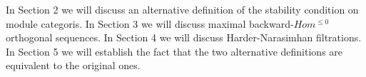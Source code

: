 \indent In Section 2 we will discuss an alternative definition of the stability condition on module categoris. In Section 3 we will discuss maximal backward-$Hom^{\leq 0}$ orthogonal sequences. In Section 4 we will discuss Harder-Narasimhan filtrations. In Section 5 we will establish the fact that the two alternative definitions are equivalent to the original ones.\\
